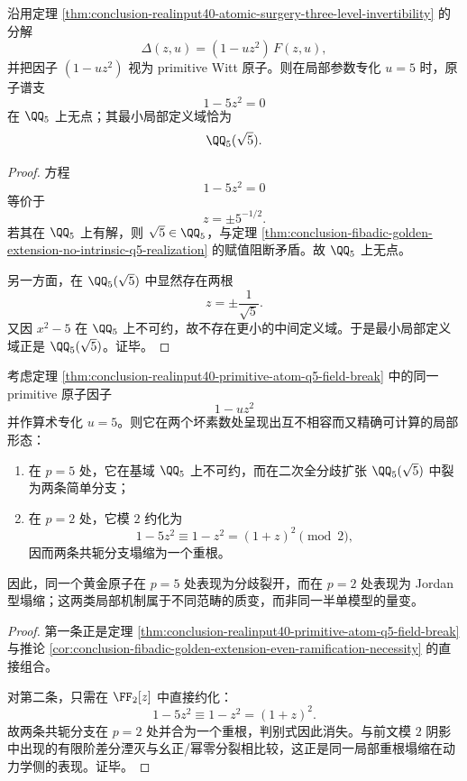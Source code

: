 \begin{theorem}[primitive 原子谱支在 \texorpdfstring{$u=5$}{u=5} 处的基域断裂]\label{thm:conclusion-realinput40-primitive-atom-q5-field-break}
沿用定理 \ref{thm:conclusion-realinput40-atomic-surgery-three-level-invertibility} 的分解
\[
\Delta(z,u)=(1-uz^2)\,F(z,u),
\]
并把因子 \((1-uz^2)\) 视为 primitive Witt 原子。则在局部参数专化 \(u=5\) 时，原子谱支
\[
1-5z^2=0
\]
在 \(\QQ_5\) 上无点；其最小局部定义域恰为
\[
\QQ_5(\sqrt5).
\]
\end{theorem}
\begin{proof}
方程
\[
1-5z^2=0
\]
等价于
\[
z=\pm 5^{-1/2}.
\]
若其在 \(\QQ_5\) 上有解，则 \(\sqrt5\in\QQ_5\)，与定理 \ref{thm:conclusion-fibadic-golden-extension-no-intrinsic-q5-realization} 的赋值阻断矛盾。故 \(\QQ_5\) 上无点。

另一方面，在 \(\QQ_5(\sqrt5)\) 中显然存在两根
\[
z=\pm \frac1{\sqrt5}.
\]
又因 \(x^2-5\) 在 \(\QQ_5\) 上不可约，故不存在更小的中间定义域。于是最小局部定义域正是 \(\QQ_5(\sqrt5)\)。证毕。
\end{proof}

\begin{theorem}\label{thm:conclusion-realinput40-golden-atom-double-local-fission-at-2-and-5}
考虑定理 \ref{thm:conclusion-realinput40-primitive-atom-q5-field-break} 中的同一 primitive 原子因子
\[
1-uz^2
\]
并作算术专化 \(u=5\)。则它在两个坏素数处呈现出互不相容而又精确可计算的局部形态：
\begin{enumerate}
  \item 在 \(p=5\) 处，它在基域 \(\QQ_5\) 上不可约，而在二次全分歧扩张 \(\QQ_5(\sqrt5)\) 中裂为两条简单分支；
  \item 在 \(p=2\) 处，它模 \(2\) 约化为
  \[
  1-5z^2\equiv 1-z^2=(1+z)^2 \pmod 2,
  \]
  因而两条共轭分支塌缩为一个重根。
\end{enumerate}
因此，同一个黄金原子在 \(p=5\) 处表现为分歧裂开，而在 \(p=2\) 处表现为 Jordan 型塌缩；这两类局部机制属于不同范畴的质变，而非同一半单模型的量变。
\end{theorem}
\begin{proof}
第一条正是定理 \ref{thm:conclusion-realinput40-primitive-atom-q5-field-break} 与推论 \ref{cor:conclusion-fibadic-golden-extension-even-ramification-necessity} 的直接组合。

对第二条，只需在 \(\FF_2[z]\) 中直接约化：
\[
1-5z^2\equiv 1-z^2=(1+z)^2.
\]
故两条共轭分支在 \(p=2\) 处并合为一个重根，判别式因此消失。与前文模 \(2\) 阴影中出现的有限阶差分湮灭与幺正/幂零分裂相比较，这正是同一局部重根塌缩在动力学侧的表现。证毕。
\end{proof}

